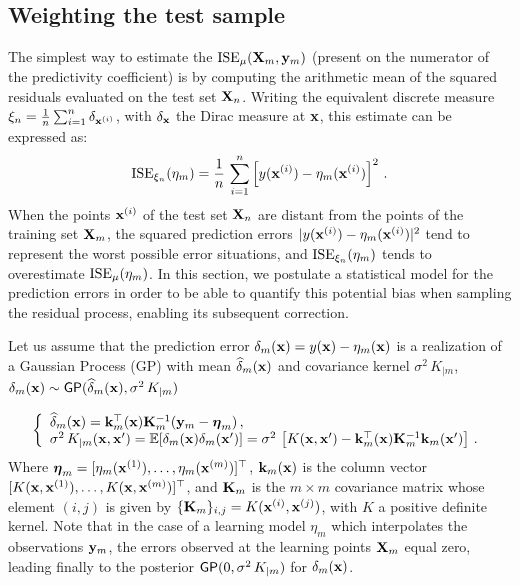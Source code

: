 \subsection{Weighting the test sample}\label{sec:weighting}

The simplest way to estimate the $\mathrm{ISE}_\mu({\bf X}_m,{\bf y}_m)$ (present on the numerator of the predictivity coefficient) is by computing the arithmetic mean of the squared residuals evaluated on the test set ${\bf X}_n$. 
Writing the equivalent discrete measure $\xi_n = \frac1n \sum_{i=1}^n \delta_{{\bf x}^{(i)}}$, with $\delta_{{\bf x}}$ the Dirac measure at ${\bf x}$, this estimate can be expressed as:
$$
\mathrm{ISE}_{\xi_n}(\eta_m) = \frac1n\, \sum_{i=1}^n \left[ y({\bf x}^{(i)})-\eta_m({\bf x}^{(i)})\right]^2 \,.
$$
When the points ${\bf x}^{(i)}$ of the test set ${\bf X}_n$ are distant from the points of the training set ${\bf X}_m$, the squared prediction errors $|y({\bf x}^{(i)})-\eta_m({\bf x}^{(i)})|^2$ tend to represent the worst possible error situations, and $\mathrm{ISE}_{\xi_n}(\eta_m)$ tends to overestimate $\mathrm{ISE}_\mu(\eta_m)$. 
In this section, we postulate a statistical model for the prediction errors in order to be able to quantify this potential bias when sampling the residual process, enabling its subsequent correction. 

Let us assume that the prediction error $\delta_m({\bf x})=y({\bf x})-\eta_m({\bf x})$ is a realization of a Gaussian Process (GP) with mean $\widehat\delta_m({\bf x})$ and covariance kernel $\sigma^2\,K_{|m}$,
$\delta_m({\bf x})\sim\mathsf{GP}(\widehat\delta_m({\bf x}),\sigma^2\,K_{|m})$ 

\begin{equation}
    \left\{
    \begin{array}{ll}
        \widehat\delta_m({\bf x})=\mathbf{k}_m^\top({\bf x})\mathbf{K}_m^{-1}({\bf y}_m-\boldsymbol{\eta}_m)\, ,\\
        \sigma^2\, K_{|m}({\bf x},{\bf x}')=\mathbb{E}[\delta_m({\bf x})\delta_m({\bf x}')]=\sigma^2\,\left[K({\bf x},{\bf x}')-\mathbf{k}_m^\top({\bf x})\mathbf{K}_m^{-1}\mathbf{k}_m({\bf x}')\right]\,.
    \end{array}
\right.
\end{equation}
Where 
$\boldsymbol{\eta}_m=[\eta_m({\bf x}^{(1)}),\ldots,\eta_m({\bf x}^{(m)})]^\top$, 
$\mathbf{k}_m({\bf x})$ is the column vector $[K({\bf x},{\bf x}^{(1)}),\ldots,K({\bf x},{\bf x}^{(m)})]^\top$,  
and $\mathbf{K}_m$ is the $m\times m$ covariance matrix whose element $(i,j)$ is given by $\{\mathbf{K}_m\}_{i,j}=K({\bf x}^{(i)},{\bf x}^{(j)})$, with $K$ a positive definite kernel. 
Note that in the case of a learning model $\eta_m$ which interpolates the observations ${\bf y}_m$, the errors observed at the learning points ${\bf X}_m$ equal zero, leading finally to the posterior $\mathsf{GP}(0,\sigma^2\,K_{|m})$ for $\delta_m({\bf x})$. 

